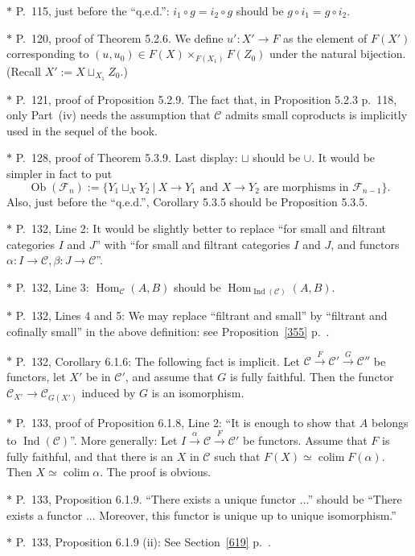 \documentclass[12pt]{article}
\theoremstyle{remark}
\theoremstyle{definition}
\newcommand{\C}{\mathcal C}
\newcommand{\F}{\mathcal F}
\DeclareMathOperator*{\coli}{colim}
\DeclareMathOperator{\Hom}{Hom}%
\DeclareMathOperator{\Ind}{Ind}
\DeclareMathOperator{\Ob}{Ob}
\begin{document}
\noindent $*$ P.~115, just before the ``q.e.d.'': $i_1\circ g=i_2\circ g$ should be $g\circ i_1=g\circ i_2$.

\noindent $*$ P.~120, proof of Theorem 5.2.6. We define $u':X'\to F$ as the element of $F(X')$ corresponding to $(u,u_0)\in F(X)\times_{F(X_1)}F(Z_0)$ under the natural bijection. (Recall $X':=X\sqcup_{X_1}Z_0$.)

\noindent $*$ P.~121, proof of Proposition 5.2.9. The fact that, in Proposition 5.2.3 p.~118, only Part~(iv) needs the assumption that $\C$ admits small coproducts is implicitly used in the sequel of the book.

\noindent $*$ P.~128, proof of Theorem 5.3.9. Last display: $\sqcup$ should be $\cup$. It would be simpler in fact to put 
$$
\Ob(\F_n):=\{Y_1\sqcup_XY_2\ |\ X\to Y_1\text{ and }X\to Y_2\text{ are morphisms in }\F_{n-1}\}.
$$ 
Also, just before the ``q.e.d.'', Corollary 5.3.5 should be Proposition 5.3.5.

\noindent $*$ P.~132, Line 2: It would be slightly better to replace ``for small and filtrant categories $I$ and $J$'' with ``for small and filtrant categories $I$ and $J$, and functors $\alpha:I\to\C,\beta:J\to\C$''.

\noindent $*$ P.~132, Line 3: $\Hom_\C(A,B)$ should be $\Hom_{\Ind(\C)}(A,B)$.

\noindent $*$ P.~132, Lines 4 and 5: \guillemotleft We may replace ``filtrant and small'' by ``filtrant and cofinally small'' in the above definition\guillemotright: see Proposition~\ref{355} p.~\pageref{355}.

\noindent $*$ P.~132, Corollary 6.1.6: The following fact is implicit. Let $\C\xrightarrow{F}\C'\xrightarrow{G}\C''$ be functors, let $X'$ be in $\C'$, and assume that $G$ is fully faithful. Then the functor $\C_{X'}\to\C_{G(X')}$ induced by $G$ is an isomorphism.

\noindent $*$ P.~133, proof of Proposition 6.1.8, Line 2: ``It is enough to show that $A$ belongs to $\Ind(\C)$''. More generally: Let $I\xrightarrow{\alpha}\C\xrightarrow{F}\C'$ be functors. Assume that $F$ is fully faithful, and that there is an $X$ in $\C$ such that $F(X)\simeq\coli F(\alpha)$. Then $X\simeq\coli\alpha$. The proof is obvious.

\noindent $*$ P.~133, Proposition 6.1.9. ``There exists a unique functor ...'' should be ``There exists a functor ... Moreover, this functor is unique up to unique isomorphism.''

\noindent $*$ P.~133, Proposition 6.1.9 (ii): See Section~\ref{619} p.~\pageref{619}.
\end{document}
